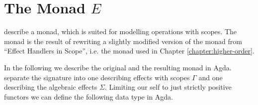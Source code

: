 \section{The Monad $E$}

\textcite{DBLP:conf/lics/PirogSWJ18} describe a monad, which is suited for
modelling operations with scopes.
The monad is the result of rewriting a slightly modified version of the monad
from ``Effect Handlers in Scope'', i.e. the monad used in Chapter
\ref{chapter:higher-order}.

In the following we describe the original and the resulting monad in Agda.
\textcite{DBLP:conf/lics/PirogSWJ18} separate the signature into one describing
effects with scopes $\Gamma$ and one describing the algebraic effects $\Sigma$.
Limiting our self to just strictly positive functors we can define the following
data type in Agda.

